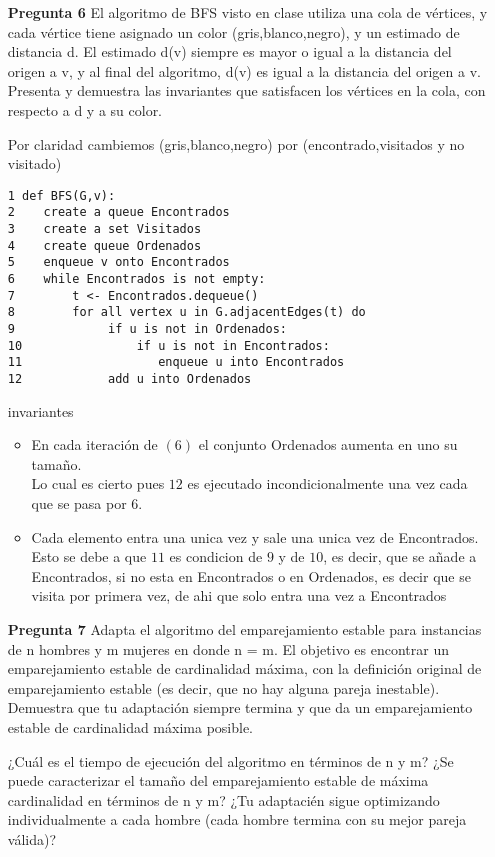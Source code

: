 \documentclass[12pt]{article}
\begin{document}
\begin{itemize}
\item[\bf{Pregunta 6}]El algoritmo de BFS visto en clase utiliza una cola de vértices, y cada vértice tiene asignado un color (gris,blanco,negro), y un estimado de distancia d. El estimado d(v) siempre es mayor o igual a la distancia del origen a v, y al final del algoritmo, d(v) es igual a la distancia del origen a v. Presenta y demuestra las invariantes que satisfacen los vértices en la cola, con respecto a d y a su color.

Por claridad cambiemos (gris,blanco,negro) por (encontrado,visitados y no visitado)
\begin{lstlisting}[frame=single] 
1 def BFS(G,v):
2    create a queue Encontrados
3    create a set Visitados
4    create queue Ordenados
5    enqueue v onto Encontrados
6    while Encontrados is not empty:
7        t <- Encontrados.dequeue()
8        for all vertex u in G.adjacentEdges(t) do
9             if u is not in Ordenados:
10                if u is not in Encontrados:
11                   enqueue u into Encontrados
12            add u into Ordenados
\end{lstlisting}

\item[invariantes]
  \begin{itemize}
 \item En cada iteración de $(6)$ el conjunto Ordenados aumenta en uno su tamaño.\\
   Lo cual es cierto pues $12$ es ejecutado incondicionalmente una vez cada que se pasa por $6$.
   \item Cada elemento entra una unica vez y sale una unica vez de Encontrados.\\
     Esto se debe a que $11$ es condicion de $9$ y de $10$, es decir, que se añade a Encontrados, si no esta en Encontrados o en Ordenados, es decir que se visita por primera vez, de ahi que solo entra una vez a Encontrados
   \end{itemize}


\item[\bf{Pregunta 7}] Adapta el algoritmo del emparejamiento estable para instancias de n hombres y m mujeres en donde n = m. El objetivo es encontrar un emparejamiento estable de cardinalidad máxima, con la definición original de emparejamiento estable (es decir, que no hay alguna pareja inestable). Demuestra que tu adaptación siempre termina y que da un emparejamiento estable de cardinalidad máxima posible.

¿Cuál es el tiempo de ejecución del algoritmo en términos de n y m?
¿Se puede caracterizar el tamaño del emparejamiento estable de máxima
cardinalidad en términos de n y m?
¿Tu adaptacién sigue optimizando individualmente a cada hombre (cada hombre termina con su mejor pareja válida)?


\end{itemize}
\end{document}
